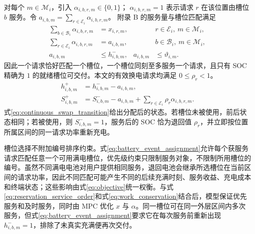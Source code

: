 \documentclass[12pt,a4paper,UTF8]{ctexart}
\begin{document}
对每个 $m\in\mathcal M_i$，引入
$\alpha_{i,b,r,m}\in\{0,1\}$；
$\alpha_{i,b,r,m}=1$ 表示请求 $r$ 在该位置由槽位 $b$ 服务。令
$a_{i,b,m}=\sum_{r\in\mathcal E_i}\alpha_{i,b,r,m}$。
附录 B 的服务量与槽位匹配满足
\begin{subequations}
\label{eq:battery_event_assignment}
\begin{align}
\sum_{b\in\mathcal B_i}\alpha_{i,b,r,m}
&=x_{i,r,m},
&&r\in\mathcal E_i,\ m\in\mathcal M_i,\\
\sum_{r\in\mathcal E_i}\alpha_{i,b,r,m}
&=a_{i,b,m},
&&b\in\mathcal B_i,\ m\in\mathcal M_i,\\
a_{i,b,m}&\le h_{i,b,m}^{-},&
a_{i,b,m}&\le \vartheta_{i,m}.
\end{align}
\end{subequations}
因此一个请求恰好匹配一个槽位，一个槽位同刻至多服务一个请求，且只有 SOC 精确为 $1$ 的就绪槽位可交付。本文的有效换电请求均满足 $0\le\rho_r<1$。
\begin{subequations}
\label{eq:continuous_swap_transition}
\begin{align}
h_{i,b,m}^{+}
&=h_{i,b,m}^{-}-a_{i,b,m},\\
S_{i,b,m}^{+}
&=S_{i,b,m}^{-}-a_{i,b,m}
+\sum_{r\in\mathcal E_i}\rho_r\alpha_{i,b,r,m}.
\end{align}
\end{subequations}
式\eqref{eq:continuous_swap_transition}给出分配后的状态。若槽位未被使用，前后状态相同；若被使用，则
$S_{i,b,m}^{-}=1$，服务后的 SOC 恰为退回值 $\rho_r$，并立即按位置所属区间的同一请求功率重新充电。

槽位选择不附加编号排序约束。式\eqref{eq:battery_event_assignment}允许每个获服务请求匹配任意一个可用满电槽位，优先级约束只限制服务对象，不限制所用槽位的编号。虽然不同满电电池对用户提供相同服务，退回电池会继承所选槽位在当前区间的请求功率，因此不同匹配可能产生不同的后续充满时刻、服务收益、充电成本和终端状态；这些影响由式\eqref{eq:objective}统一权衡。与式\eqref{eq:reservation_service_order}和式\eqref{eq:work_conservation}结合后，模型保证优先服务和及时服务，同时由 MPC 优化 $x$ 与 $\alpha$。同一槽位可在同一外层区间内多次服务，但式\eqref{eq:battery_event_assignment}要求它在每次服务前重新出现 $h_{i,b,m}^{-}=1$，排除了未真实充满便再次交付。
\end{document}
